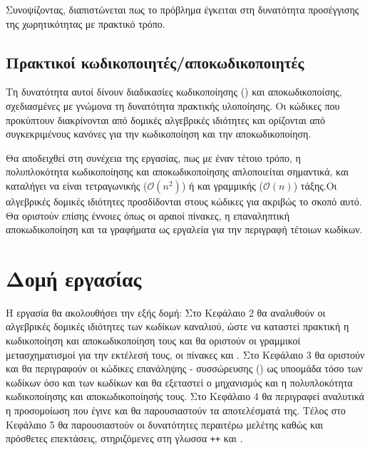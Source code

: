Συνοψίζοντας, διαπιστώνεται πως το πρόβλημα έγκειται στη δυνατότητα προσέγγισης της χωρητικότητας με πρακτικό τρόπο.
 
\subsection{Πρακτικοί κωδικοποιητές/αποκωδικοποιητές}
Τη δυνατότητα αυτοί δίνουν διαδικασίες κωδικοποίησης () και αποκωδικοποίσης, σχεδιασμένες με γνώμονα τη δυνατότητα πρακτικής υλοποίησης. Οι κώδικες που προκύπτουν διακρίνονται από δομικές αλγεβρικές ιδιότητες και ορίζονται από συγκεκριμένους κανόνες για την κωδικοποίηση και την αποκωδικοποίηση.

Θα αποδειχθεί στη συνέχεια της εργασίας, πως με έναν τέτοιο τρόπο, η πολυπλοκότητα κωδικοποίησης και αποκωδικοποίησης απλοποιείται σημαντικά, και καταλήγει να είναι τετραγωνικής ($\mathcal{O}(n^2)$) ή και γραμμικής ($\mathcal{O}(n)$) τάξης.Οι αλγεβρικές δομικές ιδιότητες προσδίδονται στους κώδικες για ακριβώς το σκοπό αυτό. Θα οριστούν επίσης έννοιες όπως οι αραιοί πίνακες, η επαναληπτική αποκωδικοποίηση και τα γραφήματα  ως εργαλεία για την περιγραφή τέτοιων κωδίκων.

\section{Δομή εργασίας}
Η εργασία θα ακολουθήσει την εξής δομή: Στο Κεφάλαιο 2 θα αναλυθούν οι αλγεβρικές δομικές ιδιότητες των κωδίκων καναλιού, ώστε να καταστεί πρακτική η κωδικοποίηση και αποκωδικοποίηση τους και θα οριστούν οι γραμμικοί μετασχηματισμοί για την εκτέλεσή τους, οι πίνακες \textbf{} και \textbf{}. Στο Κεφάλαιο 3 θα οριστούν και θα περιγραφούν οι κώδικες επανάληψης - συσσώρευσης () ως υποομάδα τόσο των κωδίκων  όσο και των  κωδίκων και θα εξεταστεί ο μηχανισμός και η πολυπλοκότητα κωδικοποίησης και αποκωδικοποίησής τους. Στο Κεφάλαιο 4 θα περιγραφεί αναλυτικά η προσομοίωση που έγινε και θα παρουσιαστούν τα αποτελέσματά της. Τέλος στο Κεφάλαιο 5 θα παρουσιαστούν οι δυνατότητες περαιτέρω μελέτης καθώς και πρόσθετες επεκτάσεις, στηριζόμενες στη γλωσσα \texttt{++} και .